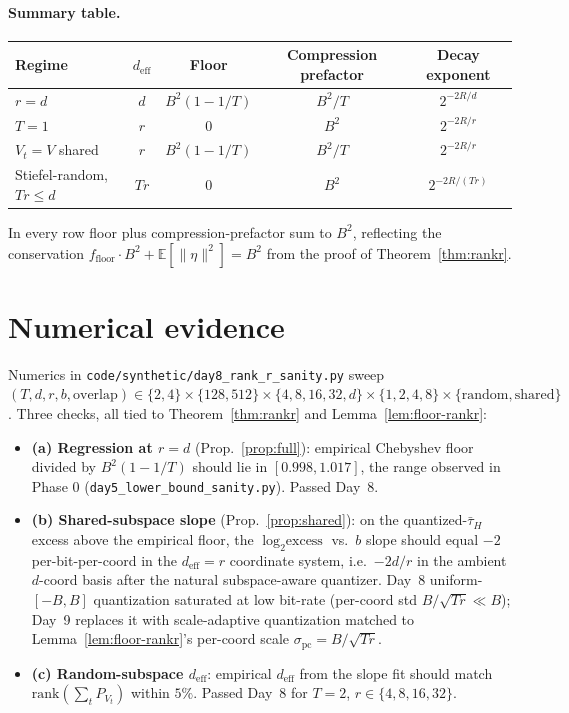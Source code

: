 \documentclass{article}
\theoremstyle{remark}
\newcommand{\E}{\mathbb{E}}
\newcommand{\rank}{\mathrm{rank}}
\newcommand{\deff}{d_{\mathrm{eff}}}
\newcommand{\tauH}{\bar\tau_{H}}
\begin{document}
\paragraph{Summary table.}
\begin{center}
\begin{tabular}{lcccc}
\hline
Regime                         & $\deff$ & Floor           & Compression prefactor & Decay exponent \\
\hline
$r = d$                        & $d$     & $B^2(1-1/T)$    & $B^2/T$               & $2^{-2R/d}$    \\
$T = 1$                        & $r$     & $0$             & $B^2$                 & $2^{-2R/r}$    \\
$V_t = V$ shared               & $r$     & $B^2(1-1/T)$    & $B^2/T$               & $2^{-2R/r}$    \\
Stiefel-random, $Tr \leq d$    & $Tr$    & $0$             & $B^2$                 & $2^{-2R/(Tr)}$ \\
\hline
\end{tabular}
\end{center}
In every row floor plus compression-prefactor sum to $B^2$, reflecting
the conservation $f_{\mathrm{floor}}\cdot B^2 + \E[\|\eta\|^2] = B^2$
from the proof of Theorem~\ref{thm:rankr}.

\section{Numerical evidence}\label{sec:num}

Numerics in \texttt{code/synthetic/day8\_rank\_r\_sanity.py} sweep
$(T, d, r, b, \text{overlap}) \in \{2,4\} \times \{128, 512\}
\times \{4, 8, 16, 32, d\} \times \{1, 2, 4, 8\} \times
\{\text{random}, \text{shared}\}$. Three checks, all tied to
Theorem~\ref{thm:rankr} and Lemma~\ref{lem:floor-rankr}:
\begin{itemize}
  \item \textbf{(a) Regression at $r = d$} (Prop.~\ref{prop:full}):
  empirical Chebyshev floor divided by $B^2(1-1/T)$ should lie in
  $[0.998, 1.017]$, the range observed in Phase 0
  (\texttt{day5\_lower\_bound\_sanity.py}). Passed Day~8.
  \item \textbf{(b) Shared-subspace slope} (Prop.~\ref{prop:shared}):
  on the quantized-$\tauH$ excess above the empirical floor, the
  $\log_2\text{excess}$ vs.\ $b$ slope should equal $-2$
  per-bit-per-coord in the $\deff = r$ coordinate system, i.e.\
  $-2 d/r$ in the ambient $d$-coord basis after the natural
  subspace-aware quantizer. Day~8 uniform-$[-B,B]$ quantization
  saturated at low bit-rate (per-coord std $B/\sqrt{Tr} \ll B$);
  Day~9 replaces it with scale-adaptive quantization matched to
  Lemma~\ref{lem:floor-rankr}'s per-coord scale $\sigma_{\mathrm{pc}}
  = B/\sqrt{Tr}$.
  \item \textbf{(c) Random-subspace $\deff$}: empirical $\deff$ from
  the slope fit should match $\rank(\sum_t P_{V_t})$ within $5\%$.
  Passed Day~8 for $T=2$, $r\in\{4,8,16,32\}$.
\end{itemize}
\end{document}
